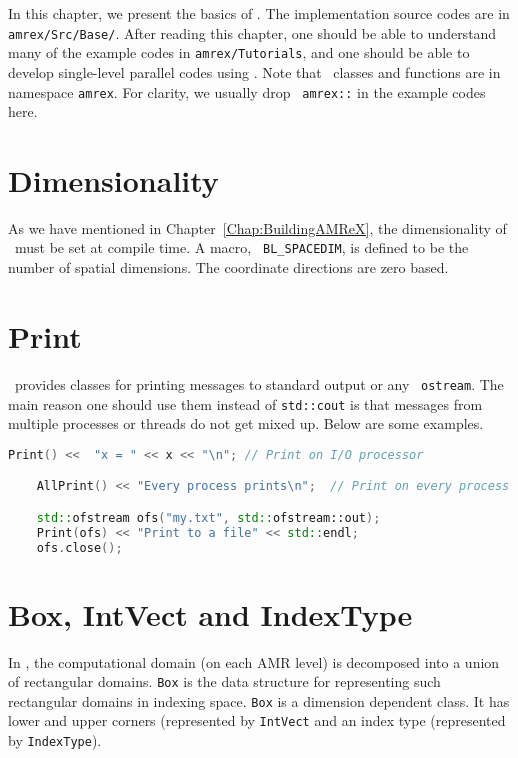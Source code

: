 In this chapter, we present the basics of \amrex.  The implementation
source codes are in {\tt amrex/Src/Base/}.  After reading this
chapter, one should be able to understand many of the example codes in
{\tt amrex/Tutorials}, and one should be able to develop single-level
parallel codes using \amrex.  Note that \amrex\ classes and functions
are in namespace {\tt amrex}.  For clarity, we usually drop {\tt
  amrex::} in the example codes here.

\section{Dimensionality}
\label{sec:basics:dim}

As we have mentioned in Chapter~\ref{Chap:BuildingAMReX}, the
dimensionality of \amrex\ must be set at compile time.  A macro, {\tt
  BL\_SPACEDIM}, is defined to be the number of spatial dimensions.
The coordinate directions are zero based. 

\section{Print}
\label{sec:basics:print}

\amrex\ provides classes for printing messages to standard output or
any \cpp\ {\tt ostream}.  The main reason one should use them instead
of {\tt std::cout} is that messages from multiple processes or
threads do not get mixed up.  Below are some examples.
\begin{lstlisting}[language=cpp]
    Print() <<  "x = " << x << "\n"; // Print on I/O processor

    AllPrint() << "Every process prints\n";  // Print on every process

    std::ofstream ofs("my.txt", std::ofstream::out);
    Print(ofs) << "Print to a file" << std::endl;
    ofs.close();
\end{lstlisting}

\section{Box, IntVect and IndexType}
\label{sec:basics:box}

In \amrex, the computational domain (on each AMR level) is decomposed
into a union of rectangular domains.  {\tt Box} is the data
structure for representing such rectangular domains in indexing space.
{\tt Box} is a dimension dependent class.  It has lower and upper
corners (represented by {\tt IntVect} and an index type
(represented by {\tt IndexType}).


